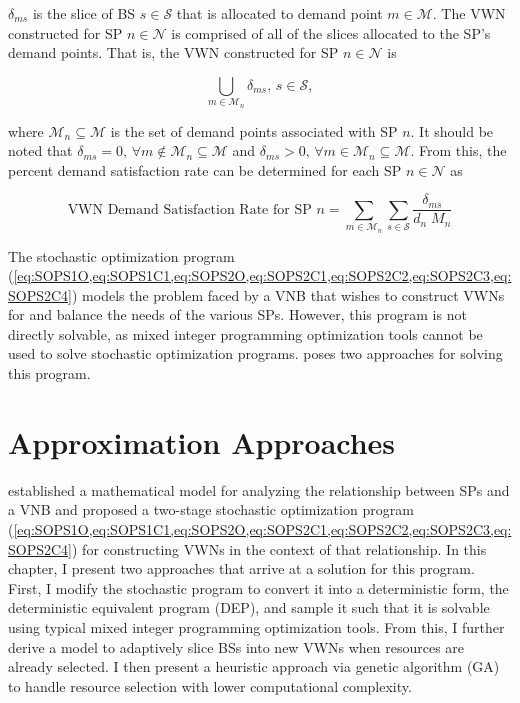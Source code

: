 \documentclass[12pt,dvipsnames]{report}
\begin{document}
$\delta_{ms}$ is the slice of BS $s \in \mathcal{S}$ that is allocated to demand point $m \in \mathcal{M}$.  The VWN constructed for SP $n \in \mathcal{N}$ is comprised of all of the slices allocated to the SP's demand points.  That is, the VWN constructed for SP $n \in \mathcal{N}$ is 

\begin{equation} \label{eq:delta_union_VWN}
\bigcup_{m \in \mathcal{M}_n} \delta_{ms},\, s \in \mathcal{S},
\end{equation}

\noindent where $\mathcal{M}_n \subseteq \mathcal{M}$ is the set of demand points associated with SP $n$.  It should be noted that $\delta_{ms} = 0,\, \forall m \not\in \mathcal{M}_n \subseteq \mathcal{M}$ and $\delta_{ms} > 0,\, \forall m \in \mathcal{M}_n \subseteq \mathcal{M}$.  From this, the percent demand satisfaction rate can be determined for each SP $n \in \mathcal{N}$ as

\begin{equation} \label{eq:VWN_demand_sat}
\text{VWN Demand Satisfaction Rate for SP $n$} = \sum_{m \in \mathcal{M}_n} \sum_{s \in \mathcal{S}} \frac{\delta_{ms}}{d_n \; M_n}
\end{equation}

The stochastic optimization program (\cref{eq:SOPS1O,eq:SOPS1C1,eq:SOPS2O,eq:SOPS2C1,eq:SOPS2C2,eq:SOPS2C3,eq:SOPS2C4}) models the problem faced by a VNB that wishes to construct VWNs for and balance the needs of the various SPs.  However, this program is not directly solvable, as mixed integer programming optimization tools cannot be used to solve stochastic optimization programs.   poses two approaches for solving this program.

\iftrue
\pagebreak
\chapter{Approximation Approaches} \label{ch:approaches}

 established a mathematical model for analyzing the relationship between SPs and a VNB and proposed a two-stage stochastic optimization program (\cref{eq:SOPS1O,eq:SOPS1C1,eq:SOPS2O,eq:SOPS2C1,eq:SOPS2C2,eq:SOPS2C3,eq:SOPS2C4}) for constructing VWNs in the context of that relationship.  In this chapter, I present two approaches that arrive at a solution for this program.  First, I modify the stochastic program to convert it into a deterministic form, the deterministic equivalent program (DEP), and sample it such that it is solvable using typical mixed integer programming optimization tools.  From this, I further derive a model to adaptively slice BSs into new VWNs when resources are already selected.  I then present a heuristic approach via genetic algorithm (GA) to handle resource selection with lower computational complexity.
\end{document}
